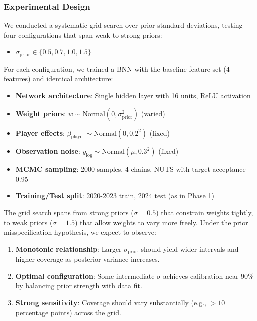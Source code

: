 \subsubsection{Experimental Design}

We conducted a systematic grid search over prior standard deviations, testing four configurations that span weak to strong priors:

\begin{itemize}
    \item $\sigma_{\text{prior}} \in \{0.5, 0.7, 1.0, 1.5\}$
\end{itemize}

For each configuration, we trained a BNN with the baseline feature set (4 features) and identical architecture:

\begin{itemize}
    \item \textbf{Network architecture}: Single hidden layer with 16 units, ReLU activation
    \item \textbf{Weight priors}: $w \sim \text{Normal}(0, \sigma_{\text{prior}}^2)$ (varied)
    \item \textbf{Player effects}: $\beta_{\text{player}} \sim \text{Normal}(0, 0.2^2)$ (fixed)
    \item \textbf{Observation noise}: $y_{\log} \sim \text{Normal}(\mu, 0.3^2)$ (fixed)
    \item \textbf{MCMC sampling}: 2000 samples, 4 chains, NUTS with target acceptance 0.95
    \item \textbf{Training/Test split}: 2020-2023 train, 2024 test (as in Phase 1)
\end{itemize}

The grid search spans from strong priors ($\sigma = 0.5$) that constrain weights tightly, to weak priors ($\sigma = 1.5$) that allow weights to vary more freely. Under the prior misspecification hypothesis, we expect to observe:

\begin{enumerate}
    \item \textbf{Monotonic relationship}: Larger $\sigma_{\text{prior}}$ should yield wider intervals and higher coverage as posterior variance increases.
    \item \textbf{Optimal configuration}: Some intermediate $\sigma$ achieves calibration near 90\% by balancing prior strength with data fit.
    \item \textbf{Strong sensitivity}: Coverage should vary substantially (e.g., $>10$ percentage points) across the grid.
\end{enumerate}

